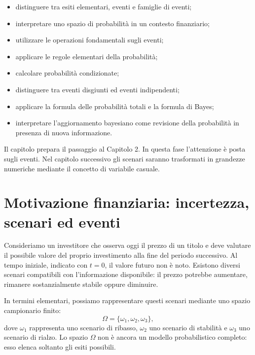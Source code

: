 \begin{itemize}
\item distinguere tra esiti elementari, eventi e famiglie di eventi;

\item interpretare uno spazio di probabilit\`{a} in un contesto finanziario;

\item utilizzare le operazioni fondamentali sugli eventi;

\item applicare le regole elementari della probabilit\`{a};

\item calcolare probabilit\`{a} condizionate;

\item distinguere tra eventi disgiunti ed eventi indipendenti;

\item applicare la formula delle probabilit\`{a} totali e la formula di Bayes;

\item interpretare l'aggiornamento bayesiano come revisione della
probabilit\`{a} in presenza di nuova informazione.
\end{itemize}

Il capitolo prepara il passaggio al Capitolo 2. In questa fase l'attenzione
\`{e} posta sugli eventi. Nel capitolo successivo gli scenari saranno
trasformati in grandezze numeriche mediante il concetto di variabile casuale.

\section{Motivazione finanziaria: incertezza, scenari ed eventi}

Consideriamo un investitore che osserva oggi il prezzo di un titolo e deve
valutare il possibile valore del proprio investimento alla fine del periodo
successivo. Al tempo iniziale, indicato con $t=0$, il valore futuro non \`{e}
noto. Esistono diversi scenari compatibili con l'informazione disponibile: il
prezzo potrebbe aumentare, rimanere sostanzialmente stabile oppure diminuire.

In termini elementari, possiamo rappresentare questi scenari mediante uno
spazio campionario finito:
\[
\Omega=\{\omega_{1},\omega_{2},\omega_{3}\},
\]
dove $\omega_{1}$ rappresenta uno scenario di ribasso, $\omega_{2}$ uno
scenario di stabilit\`{a} e $\omega_{3}$ uno scenario di rialzo. Lo spazio
$\Omega$ non \`{e} ancora un modello probabilistico completo: esso elenca
soltanto gli esiti possibili.

